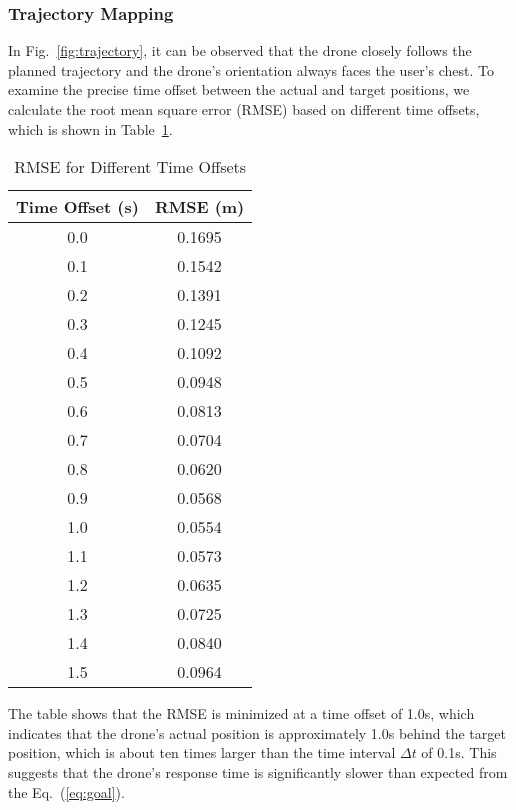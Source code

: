 \subsubsection{Trajectory Mapping}
In Fig.~\ref{fig:trajectory}, it can be observed that the drone closely follows the planned trajectory and the drone's orientation always faces the user's chest.
To examine the precise time offset between the actual and target positions, we calculate the root mean square error (RMSE) based on different time offsets, which is shown in Table~\ref{tab:rmse}.
\begin{table}[t]
  \centering
  \caption{RMSE for Different Time Offsets}
  \begin{tabular}{cc}
      \toprule
      Time Offset (s) & RMSE (m) \\
      \midrule
      0.0 & 0.1695 \\
      0.1 & 0.1542 \\
      0.2 & 0.1391 \\
      0.3 & 0.1245 \\
      0.4 & 0.1092 \\
      0.5 & 0.0948 \\
      0.6 & 0.0813 \\
      0.7 & 0.0704 \\
      0.8 & 0.0620 \\
      0.9 & 0.0568 \\
      1.0 & 0.0554 \\
      1.1 & 0.0573 \\
      1.2 & 0.0635 \\
      1.3 & 0.0725 \\
      1.4 & 0.0840 \\
      1.5 & 0.0964 \\
      \bottomrule
  \end{tabular}
  \label{tab:rmse}
\end{table}
The table shows that the RMSE is minimized at a time offset of 1.0s, which indicates that the drone's actual position is approximately 1.0s behind the target position,
which is about ten times larger than the time interval $\Delta t$ of 0.1s.
This suggests that the drone's response time is significantly slower than expected from the Eq.~(\ref{eq:goal}).

